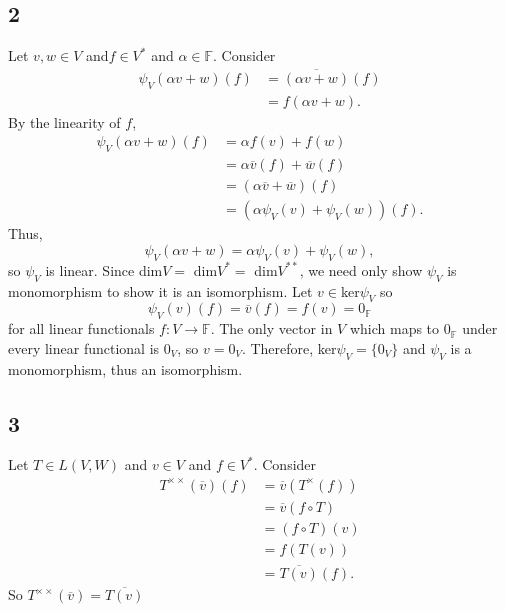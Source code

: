 \documentclass[12pt]{article}
\newcommand{\F}{\mathbb{F}}
\begin{document}
\subsection*{2}
Let $v, w \in V$ and$f\in V^*$ and $\alpha\in\F$. Consider
\begin{align*}
    \psi_V(\alpha v + w)(f) &= \overline{(\alpha v + w)}(f) \\
                            &= f(\alpha v + w).
\end{align*}
By the linearity of $f$,
\begin{align*}
    \psi_V(\alpha v + w)(f) &= \alpha f(v) + f(w) \\
                            &= \alpha \overline{v}(f) + \overline{w}(f) \\
                            &= (\alpha \overline{v} + \overline{w})(f) \\
                            &= (\alpha \psi_V(v) + \psi_V(w))(f).
\end{align*}
Thus,
\[\psi_V(\alpha v + w) = \alpha \psi_V(v) + \psi_V(w),\]
so $\psi_V$ is linear. Since dim$V =$ dim$V^* =$ dim$V^{**}$, we need only show $\psi_V$ is monomorphism to show it is an isomorphism. Let $v\in$ker$\psi_V$ so 
\[\psi_V(v)(f) = \overline{v}(f) = f(v) = 0_\F\]
for all linear functionals $f:V\rightarrow\F$. The only vector in $V$ which maps to $0_\F$ under every linear functional is $0_V$, so $v=0_V$. Therefore, ker$\psi_V = \{0_V\}$ and $\psi_V$ is a monomorphism, thus an isomorphism.

\subsection*{3}
Let $T\in L(V,W)$ and $v\in V$ and $f\in V^*$. Consider
\begin{align*}
    T^{\times\times}(\overline{v})(f) &= \overline{v}(T^\times(f)) \\
                            &= \overline{v}(f \circ T) \\
                            &= (f \circ T)(v) \\
                            &= f(T(v)) \\
                            &= \overline{T(v)}(f).
\end{align*}
So $T^{\times\times}(\overline{v}) = \overline{T(v)}$

\newpage
\end{document}
